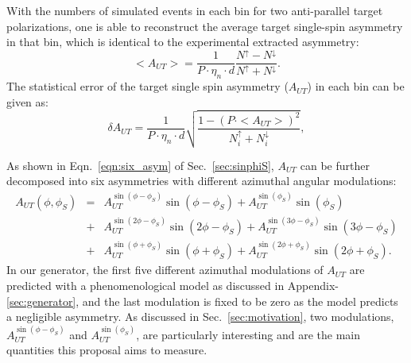 With the numbers of simulated events in each bin for two anti-parallel target
polarizations, one is able to reconstruct the average target single-spin
asymmetry in that bin, which is identical to the experimental extracted
asymmetry:
\begin{equation}
   <A_{UT}> = \frac{1}{P\cdot\eta_{n}\cdot d}
   \frac{N^{\uparrow}-N^{\downarrow}}{N^{\uparrow}+N^{\downarrow}}.
   \label{eqn:asym_exp}
\end{equation}
The statistical error of the target single spin asymmetry ($A_{UT}$) in each
bin can be given as:
  \begin{equation}
    \delta A_{UT} = \frac{1}{P\cdot\eta_{n}\cdot d} \sqrt{\frac{1-(P\cdot
        <A_{UT}>)^{2}}{N^{\uparrow}_{i}+N^{\downarrow}_{i}}},
    \label{eqn:stat_err}
 \end{equation}
 

As shown in Eqn.~\ref{eqn:six_asym} of Sec.~\ref{sec:sinphiS}, $A_{UT}$ can be
further decomposed into six asymmetries with different azimuthal angular
modulations:
   \begin{eqnarray}
        A_{UT}(\phi, \phi_{S}) &=& A_{UT}^{\sin(\phi-\phi_{S})}
        \sin(\phi-\phi_{S})+ A_{UT}^{\sin(\phi_{S})} \sin(\phi_{S}) \nonumber \\
       &+& A_{UT}^{\sin(2\phi-\phi_{S})} \sin(2\phi-\phi_{S})+
        A_{UT}^{\sin(3\phi-\phi_{S})} \sin(3\phi-\phi_{S}) \nonumber \\
      &+& A_{UT}^{\sin(\phi+\phi_{S})}
        \sin(\phi+\phi_{S})+A_{UT}^{\sin(2\phi+\phi_{S})} \sin(2\phi+\phi_{S}).
   \label{eqn:six_asym2}
   \end{eqnarray}
In our generator, the first five different azimuthal modulations of $A_{UT}$
are predicted with a phenomenological model as discussed in
Appendix-\ref{sec:generator}, and the last modulation is fixed to be zero as
the model predicts a negligible asymmetry.  As discussed in
Sec.~\ref{sec:motivation}, two modulations, $A_{UT}^{\sin(\phi-\phi_{S})} $ and
$A_{UT}^{\sin(\phi_{S})}$, are particularly interesting and are the main
quantities this proposal aims to measure.

